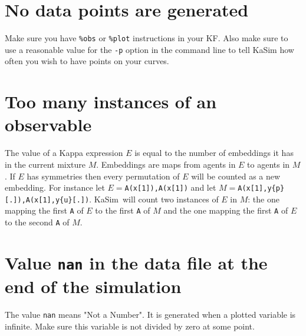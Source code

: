 \documentclass[11pt]{book}
\def\KaSim{\textsf{KaSim}}
\def\ttt#1{\texttt{#1}}
\begin{document}
\section*{No data points are generated}
Make sure you have \ttt{\%obs} or \ttt{\%plot} instructions in your KF. Also make sure to use a reasonable value for the \ttt{-p} option in the command line to tell KaSim how often you wish to have points on your curves.

\section*{Too many instances of an observable}
The value of a Kappa expression $E$  is equal to the number of embeddings it has in the current mixture $M$. Embeddings are maps from agents in $E$  to agents in $M$. If $E$ has symmetries then every permutation of $E$ will be counted as a new embedding. For instance let $E=$\ttt{A(x[1]),A(x[1])}  and let $M=$\ttt{A(x[1],y\{p\}[.]),A(x[1],y\{u\}[.])}.
\KaSim~will count two instances of $E$ in $M$: the one mapping the first \ttt{A} of $E$ to the first \ttt{A} of $M$ and the one mapping the first \ttt{A} of $E$ to the second \ttt{A} of $M$.


\section*{Value \ttt{nan} in the data file at the end of the simulation}
The value \ttt{nan} means "Not a Number". It is generated when a plotted variable is infinite. Make sure this variable is not divided by zero at some point.




\printindex
\end{document}
